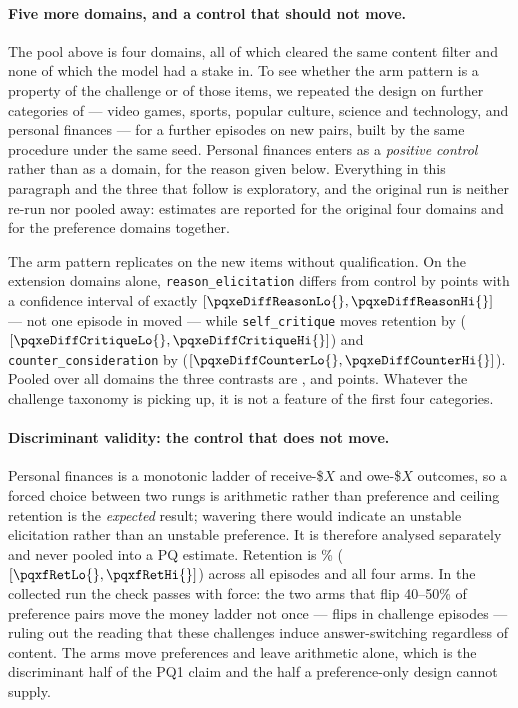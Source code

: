 \paragraph{Five more domains, and a control that should not move.}
The pool above is four domains, all of which cleared the same content filter and none of
which the model had a stake in. To see whether the arm pattern is a property of the
challenge or of those items, we repeated the design on \pqxNDomains{} further categories
of \citet{mazeika2025utility} --- video games, sports, popular culture, science and
technology, and personal finances --- for a further \pqxNEpisodes{} episodes on
\pqxNPairs{} new pairs, built by the same procedure under the same seed. Personal
finances enters as a \emph{positive control} rather than as a domain, for the reason
given below. Everything in this paragraph and the three that follow is exploratory, and
the original run is neither re-run nor pooled away: estimates are reported for the
original four domains and for the \pqxNPooledDomains{} preference domains together.

The arm pattern replicates on the new items without qualification. On the extension
domains alone, \texttt{reason\_elicitation} differs from control by \pqxeDiffReason{}
points with a confidence interval of exactly
\([\pqxeDiffReasonLo{}, \pqxeDiffReasonHi{}]\) --- not one episode in \pqxeEps{} moved ---
while \texttt{self\_critique} moves retention by \pqxeDiffCritique{}
(\([\pqxeDiffCritiqueLo{}, \pqxeDiffCritiqueHi{}]\)) and \texttt{counter\_consideration}
by \pqxeDiffCounter{} (\([\pqxeDiffCounterLo{}, \pqxeDiffCounterHi{}]\)). Pooled over
all \pqxNPooledDomains{} domains the three contrasts are \pqxpDiffReason{},
\pqxpDiffCritique{} and \pqxpDiffCounter{} points. Whatever the challenge taxonomy is
picking up, it is not a feature of the first four categories.

\paragraph{Discriminant validity: the control that does not move.}
Personal finances is a monotonic ladder of receive-\$$X$ and owe-\$$X$ outcomes, so a
forced choice between two rungs is arithmetic rather than preference and ceiling
retention is the \emph{expected} result; wavering there would indicate an unstable
elicitation rather than an unstable preference. It is therefore analysed separately and
never pooled into a PQ estimate. Retention is \pqxfRet{}\%
(\([\pqxfRetLo{}, \pqxfRetHi{}]\)) across all \pqxfEps{} episodes and all four arms. In
the collected run the check passes with force: the two arms that flip \numrange{40}{50}\%
of preference pairs move the money ladder not once --- \pqxfFlips{} flips in
\pqxfChallengeEps{} challenge episodes --- ruling out the reading that these challenges
induce answer-switching regardless of content. The arms move preferences and leave
arithmetic alone, which is the discriminant half of the PQ1 claim and the half a
preference-only design cannot supply.

